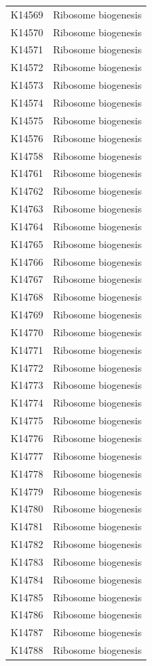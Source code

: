 \begin{longtable}{@{}l l@{}}
K14569 & Ribosome biogenesis \\
K14570 & Ribosome biogenesis \\
K14571 & Ribosome biogenesis \\
K14572 & Ribosome biogenesis \\
K14573 & Ribosome biogenesis \\
K14574 & Ribosome biogenesis \\
K14575 & Ribosome biogenesis \\
K14576 & Ribosome biogenesis \\
K14758 & Ribosome biogenesis \\
K14761 & Ribosome biogenesis \\
K14762 & Ribosome biogenesis \\
K14763 & Ribosome biogenesis \\
K14764 & Ribosome biogenesis \\
K14765 & Ribosome biogenesis \\
K14766 & Ribosome biogenesis \\
K14767 & Ribosome biogenesis \\
K14768 & Ribosome biogenesis \\
K14769 & Ribosome biogenesis \\
K14770 & Ribosome biogenesis \\
K14771 & Ribosome biogenesis \\
K14772 & Ribosome biogenesis \\
K14773 & Ribosome biogenesis \\
K14774 & Ribosome biogenesis \\
K14775 & Ribosome biogenesis \\
K14776 & Ribosome biogenesis \\
K14777 & Ribosome biogenesis \\
K14778 & Ribosome biogenesis \\
K14779 & Ribosome biogenesis \\
K14780 & Ribosome biogenesis \\
K14781 & Ribosome biogenesis \\
K14782 & Ribosome biogenesis \\
K14783 & Ribosome biogenesis \\
K14784 & Ribosome biogenesis \\
K14785 & Ribosome biogenesis \\
K14786 & Ribosome biogenesis \\
K14787 & Ribosome biogenesis \\
K14788 & Ribosome biogenesis \\

\end{longtable}
